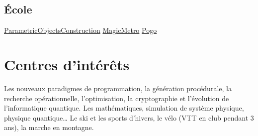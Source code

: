 \documentclass[letterpaper,10pt,sans]{moderncv}
\begin{document}
		\subsection{École}
				{\href{https://github.com/pinam45/UTBM\_IN55\_ParametricObjectsConstruction}{ParametricObjectsConstruction}}
				{\href{https://github.com/TiWinDeTea/MagicMetro}{MagicMetro}}
				{\href{https://github.com/pinam45/UTBM_IA41_Pogo}{Pogo}}


	\vspace*{\deletedSpace}
	\printbibliography[title=Publications]{}


	\vspace*{\deletedSpace}
	\section{Centres d'intérêts}
			{Les nouveaux paradigmes de programmation, la génération procédurale, la recherche opérationnelle, l'optimisation, la cryptographie et l'évolution de l'informatique quantique.}
			{Les mathématiques, simulation de système physique, physique quantique\ldots}
			{Le ski et les sports d'hivers, le vélo (VTT en club pendant 3 ans), la marche en montagne.}
\end{document}
